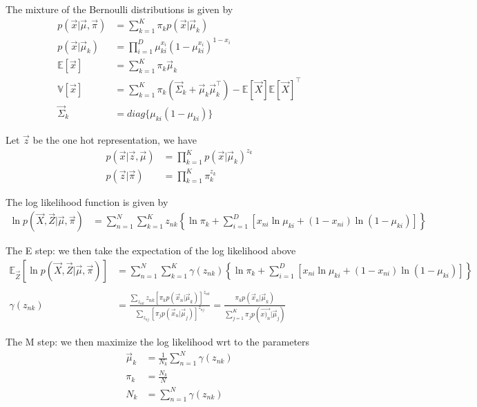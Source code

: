 \documentclass[12pt,twoside]{article}
\begin{document}
The mixture of the Bernoulli distributions is given by
\begin{align*}
p(\vec{x}\vert \vec{\mu}, \vec{\pi})&=\sum_{k=1}^K \pi_kp(\vec{x}\vert \vec{\mu}_k)\\
p(\vec{x}\vert \vec{\mu}_k) &= \prod^{D}_{i=1} \mu_{ki}^{x_i} (1- \mu_{ki}^{x_i})^{1-x_i}\\
\mathbb{E}[\vec{x}] & = \sum_{k=1}^K \pi_k\vec{\mu}_k\\
\mathbb{V}[\vec{x}] &= \sum_{k=1}^K \pi_k \left(\vec{\Sigma}_k + \vec{\mu}_k\vec{\mu}_k^\top\right) - \mathbb{E}[\vec{X}]\mathbb{E}[\vec{X}]^\top\\
\vec{\Sigma}_k & = diag\lbrace \mu_{ki}(1-\mu_{ki})\rbrace
\end{align*}

Let $\vec{z}$ be the one hot representation, we have
\begin{align*}
	p(\vec{x} \vert \vec{z}, \vec{\mu}) &= \prod_{k=1}^K p(\vec{x}\vert \vec{\mu}_k)^{z_k}\\
	p(\vec{z}\vert \vec{\pi}) &= \prod_{k=1}^K \pi_k^{z_k}
\end{align*}

The log likelihood function is given by
\begin{align*}
	\ln p(\vec{X}, \vec{Z} \vert \vec{\mu}, \vec{\pi})&=\sum_{n=1}^N\sum_{k=1}^Kz_{nk}
	\left\lbrace 
	\ln \pi_k +\sum_{i=1}^D[x_{ni}\ln\mu_{ki}+(1-x_{ni})\ln(1-\mu_{ki})]
	\right\rbrace
\end{align*}

The E step: we then take the expectation of the log likelihood above
\begin{align*}
\mathbb{E}_{\vec{Z}}[\ln p(\vec{X}, \vec{Z} \vert \vec{\mu}, \vec{\pi})]&=\sum_{n=1}^N\sum_{k=1}^K\gamma(z_{nk})
\left\lbrace 
\ln \pi_k +\sum_{i=1}^D[x_{ni}\ln\mu_{ki}+(1-x_{ni})\ln(1-\mu_{ki})]
\right\rbrace\\
&\\
\gamma(z_{nk})& = \frac{\sum_{z_{nk}} z_{nk}[\pi_kp(\vec{x}_n\vert \vec{\mu}_k)]^{z_{nk}} }{\sum_{z_{nj}}[\pi_jp(\vec{x}_n\vert \vec{\mu}_j)]^{z_{nj}}}
=\frac{\pi_kp(\vec{x}_n\vert \vec{\mu}_k)}{\sum_{j=1}^K \pi_jp(\vec{x)_n}\vert \vec{\mu}_j)}
\end{align*}

The M step: we then maximize the log likelihood wrt to the parameters
\begin{align*}
	\vec{\mu}_k &=\frac{1}{N_k}\sum_{n=1}^N \gamma(z_{nk})\\
	\pi_k&=\frac{N_k}{N}\\
	N_k &= \sum_{n=1}^N \gamma(z_{nk})
\end{align*}
\end{document}
